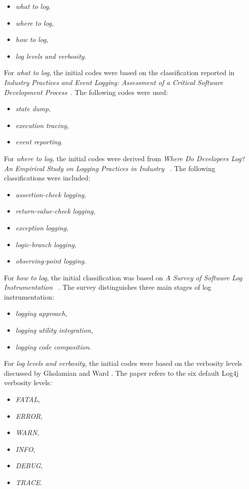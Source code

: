 \begin{itemize}
\item \textit{what to log},
\item \textit{where to log},
\item \textit{how to log},
\item \textit{log levels and verbosity}.
\end{itemize}

For \textit{what to log}, the initial codes were based on the classification reported
in \textit{Industry Practices and Event Logging: Assessment of a Critical Software
Development Process}~\cite{peccia2015industrypracticesandeventlogging}. The following
codes were used:

\begin{itemize}
\item \textit{state dump},
\item \textit{execution tracing},
\item \textit{event reporting}.
\end{itemize}

For \textit{where to log}, the initial codes were derived from
\textit{Where Do Developers Log? An Empirical Study on Logging Practices in Industry}
~\cite{fu2014wheredodeveloperslog}. The following classifications were included:

\begin{itemize}
\item \textit{assertion-check logging},
\item \textit{return-value-check logging},
\item \textit{exception logging},
\item \textit{logic-branch logging},
\item \textit{observing-point logging}.
\end{itemize}

For \textit{how to log}, the initial classification was based on
\textit{A Survey of Software Log Instrumentation}
~\cite{chen2021asurveyofsoftwareloginstrumentation}. The survey distinguishes three
main stages of log instrumentation:
\clearpage
\begin{itemize}
\item \textit{logging approach},
\item \textit{logging utility integration},
\item \textit{logging code composition}.
\end{itemize}

For \textit{log levels and verbosity}, the initial codes were based on the verbosity
levels discussed by Gholamian and Ward \cite{gholamian2021whatdistributedsystemssay}.
The paper refers to the six default Log4j verbosity levels:
\begin{itemize}
\item \textit{FATAL},
\item \textit{ERROR},
\item \textit{WARN},
\item \textit{INFO},
\item \textit{DEBUG},
\item \textit{TRACE}.
\end{itemize}

